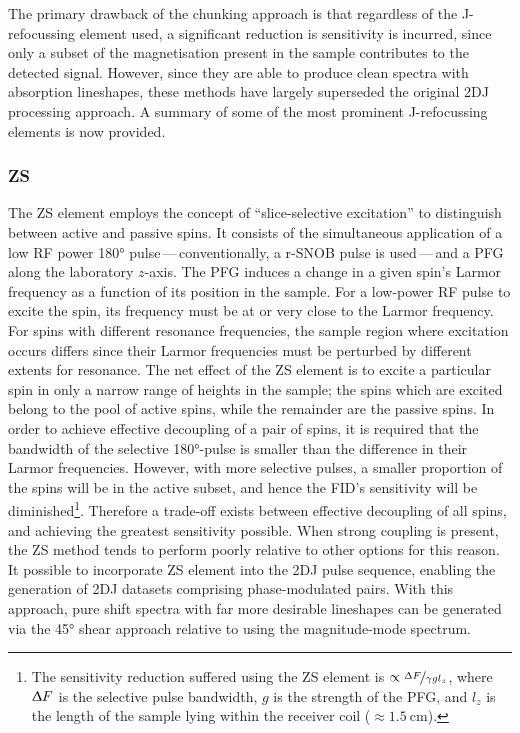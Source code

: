 The primary drawback of the chunking approach is that regardless of the
J-refocussing element used, a significant reduction is sensitivity is incurred,
since only a subset of the magnetisation present in the sample contributes to
the detected signal. However, since they are able to produce clean
spectra with absorption lineshapes, these methods have largely superseded the
original \ac{2DJ} processing approach. A summary of some of the most prominent
J-refocussing elements is now provided.

\subsubsection{\ac{ZS}}
\label{subsec:ZS}
The \ac{ZS} element employs the concept of ``slice-selective excitation'' to
distinguish between active and passive spins\cite{Zangger1997,Aguilar2010}. It
consists of the simultaneous application of a low \ac{RF} power \ang{180}
pulse\,---\,conventionally, a r-SNOB pulse is used\cite{Kupce1995}\,---\,and a
\ac{PFG} along the laboratory $z$-axis.
The \ac{PFG} induces a change in a given spin's Larmor frequency as a
function of its position in the sample. For a low-power \ac{RF} pulse to excite the
spin, its
frequency must be at or very close to the Larmor frequency.
For spins with different resonance frequencies, the sample region where
excitation occurs differs since their Larmor frequencies must be perturbed by
different extents for resonance.
The net effect of the \ac{ZS} element is to excite a particular spin in only a
narrow range of heights in the sample; the spins which are excited belong to
the pool of active spins, while the remainder are the passive spins.
In order to achieve effective decoupling of a pair of spins, it is required
that the bandwidth of the selective \ang{180}-pulse is smaller than the
difference in their Larmor frequencies. However, with more selective pulses,
a smaller proportion of the spins will be in the active subset, and hence the
\ac{FID}'s sensitivity will be diminished\footnote{
    The sensitivity reduction suffered using the \ac{ZS} element is $\propto
    \nicefrac{\Updelta F}{\gamma g l_z}$, where $\Updelta F$ is the selective
    pulse bandwidth, $g$ is the strength of the \ac{PFG}, and $l_z$ is the
    length of the sample lying within the receiver coil ($\approx
    \qty{1.5}{\centi\meter}$).
}.
Therefore a trade-off exists between effective decoupling of all spins, and
achieving the greatest sensitivity possible. When strong coupling is present,
the \ac{ZS} method tends to perform poorly relative to other options for this
reason. It possible to incorporate \ac{ZS} element into the \ac{2DJ} pulse
sequence, enabling the generation of \ac{2DJ} datasets comprising
phase-modulated pairs\cite{Pell2007}. With this approach, pure
shift spectra with far more desirable lineshapes can be generated via the
\ang{45} shear approach relative to using the magnitude-mode spectrum.

